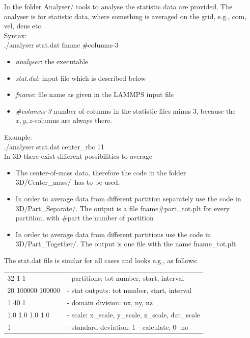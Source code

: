\documentclass[a4paper,10pt]{scrreprt}
\begin{document}
In the folder \glqq Analyser/ \grqq tools to analyse the statistic data are provided.
The analyser is for statistic data, where something is averaged on the grid, e.g., com, vel, dens etc.
\\[1ex]
Syntax:\\[0.5ex]
./analyser stat.dat fname \#columns-3
\begin{itemize}
\item \textit{analyser}: the executable
\item \textit{stat.dat}: input file which is described below
\item \textit{fname}: file name as given in the LAMMPS input file
\item \textit{\#columns-3} number of columns in the statistic files minus 3, because the $x,y,z$-columns are always there.
\end{itemize}
Example:\\[0.5ex]
./analyser stat.dat center\_rbc 11
\\[2ex]
In 3D there exist different possibilities to average
\begin{itemize}
\item The center-of-mass data, therefore the code in the folder \glqq3D/Center\_mass/\grqq\ has to be used.
\item In order to average data from different partition separately use the code in \glqq3D/Part\_Separate/\grqq. The output is a file fname\#part\_tot.plt for every partition, with \#part the number of partition
\item In order to average data from different partitions use the code in \glqq3D/Part\_Together/\grqq. The output is one file with the name fname\_tot.plt
\end{itemize}
The stat.dat file is similar for all cases and looks e.g., as follows:
\begin{table}[h!]
  \begin{tabular}{ll}
    32 1 1       & - partitions: tot number, start, interval\\
20 100000 100000 & - stat outputs: tot number, start, interval\\
1 40 1           & - domain division: nx, ny, nz\\
1.0 1.0 1.0 1.0  & - scale: x\_scale, y\_scale, z\_scale, dat\_scale\\
1                & - standard deviation: 1 - calculate, 0 -no\\
  \end{tabular}
\end{table}
\end{document}
